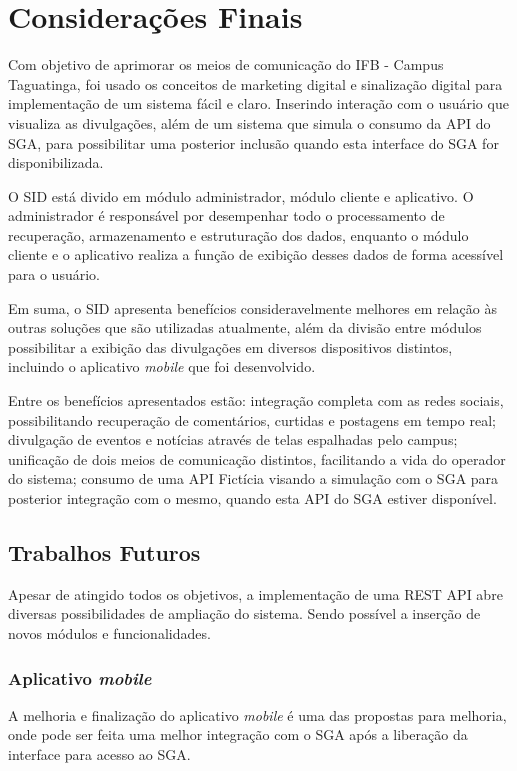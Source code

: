 ﻿\chapter[Considerações Finais]{Considerações Finais}
\label{consideracoes}
Com objetivo de aprimorar os meios de comunicação do IFB - Campus Taguatinga, foi usado os conceitos de marketing digital e sinalização digital para implementação de um sistema fácil e claro. Inserindo interação com o usuário que visualiza as divulgações, além de um sistema que simula o consumo da API do SGA, para possibilitar uma posterior inclusão quando esta interface do SGA for disponibilizada.

O SID está divido em módulo administrador, módulo cliente e aplicativo. O administrador é responsável por desempenhar todo o processamento de recuperação, armazenamento e estruturação dos dados, enquanto o módulo cliente e o aplicativo realiza a função de exibição desses dados de forma acessível para o usuário.  

Em suma, o SID apresenta benefícios consideravelmente melhores em relação às outras soluções que são utilizadas atualmente, além da divisão entre módulos possibilitar a exibição das divulgações em diversos dispositivos distintos, incluindo o aplicativo \textit{mobile} que foi desenvolvido.

Entre os benefícios apresentados estão: integração completa com as redes sociais, possibilitando recuperação de comentários, curtidas e postagens em tempo real; divulgação de eventos e notícias através de telas espalhadas pelo campus; unificação de dois meios de comunicação distintos, facilitando a vida do operador do sistema; consumo de uma API Fictícia visando a simulação com o SGA para posterior integração com o mesmo, quando esta API do SGA estiver disponível.

\section{Trabalhos Futuros}
Apesar de atingido todos os objetivos, a implementação de uma REST API abre diversas possibilidades de ampliação do sistema. Sendo possível a inserção de novos módulos e funcionalidades.

\subsection{Aplicativo \textit{mobile}}
A melhoria e finalização do aplicativo \textit{mobile} é uma das propostas para melhoria, onde pode ser feita uma melhor integração com o SGA após a liberação da interface para acesso ao SGA.


